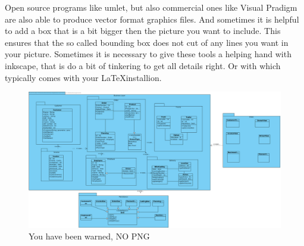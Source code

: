 Open source programs like umlet, but also commercial ones like Visual Pradigm are also able to produce
vector format graphics files. And sometimes it is helpful to add a box
that is a bit bigger then the picture you want to include.
This ensures that the so called bounding box does not cut of any lines
you want in your picture. Sometimes it is necessary to give these
tools a helping hand with inkscape, that is do a bit of tinkering to
get all details right. Or with  which typically comes with your \LaTeX installion.

\begin{figure}[htbp]
  \includegraphics[width=\linewidth]{images/ClassDiagram1.png}
  \caption{You have been warned, NO PNG}
\end{figure}

